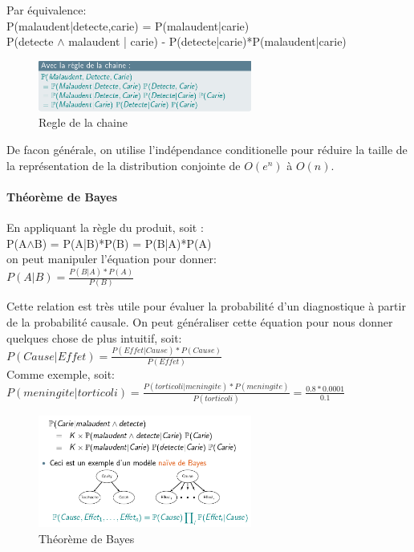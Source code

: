 \documentclass[oneside]{book}
\begin{document}
Par équivalence:\\

P(malaudent|detecte,carie) = P(malaudent|carie)\\
P(detecte $\wedge$ malaudent | carie) - P(detecte|carie)*P(malaudent|carie)\\

\begin{figure}[!ht]
\centering
\includegraphics[width = 7cm]{Regle_Chaine.png}
\caption{Regle de la chaine}
\label{fig:regle_chaine}
\end{figure}

De facon générale, on utilise l'indépendance conditionelle pour réduire la taille de la représentation de la distribution conjointe de $O(e^n)$ à $O(n)$.

\paragraph{Théorème de Bayes}
En appliquant la règle du produit, soit :\\

\centering
P(A$\wedge$B) = P(A|B)*P(B) = P(B|A)*P(A)\\

\justify
on peut manipuler l'équation pour donner:\\

\centering
$P(A|B) = \frac{P(B|A) * P(A)}{P(B)}$

\justify
Cette relation est très utile pour évaluer la probabilité d'un diagnostique à partir de la probabilité causale. On peut généraliser cette équation pour nous donner quelques chose de plus intuitif, soit:\\

\centering
$P(Cause|Effet) = \frac{P(Effet|Cause) * P(Cause)}{P(Effet)}$\\

Comme exemple, soit:\\

$P(meningite|torticoli) = \frac{P(torticoli|meningite) * P(meningite)}{P(torticoli)} = \frac{0.8*0.0001}{0.1}$\\
\justify
\begin{figure}[!ht]
\centering
\includegraphics[width = 7cm]{Bayes.png}
\caption{Théorème de Bayes}
\label{fig:bayes}
\end{figure}
 
\end{document}
